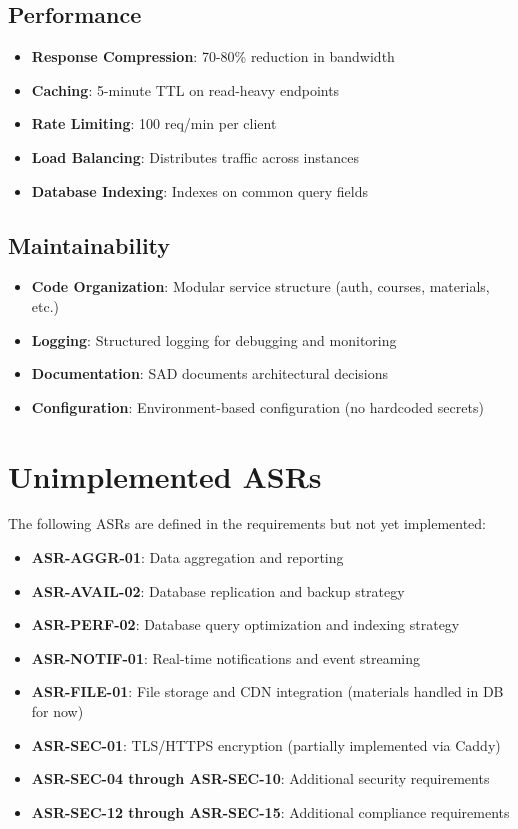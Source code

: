 \documentclass[12pt,oneside,a4paper]{article}
\begin{document}
\subsection{Performance}
\begin{itemize}
    \item \textbf{Response Compression}: 70-80\% reduction in bandwidth
    \item \textbf{Caching}: 5-minute TTL on read-heavy endpoints
    \item \textbf{Rate Limiting}: 100 req/min per client
    \item \textbf{Load Balancing}: Distributes traffic across instances
    \item \textbf{Database Indexing}: Indexes on common query fields
\end{itemize}

\subsection{Maintainability}
\begin{itemize}
    \item \textbf{Code Organization}: Modular service structure (auth, courses, materials, etc.)
    \item \textbf{Logging}: Structured logging for debugging and monitoring
    \item \textbf{Documentation}: SAD documents architectural decisions
    \item \textbf{Configuration}: Environment-based configuration (no hardcoded secrets)
\end{itemize}

\newpage

\section{Unimplemented ASRs}

The following ASRs are defined in the requirements but not yet implemented:

\begin{itemize}
    \item \textbf{ASR-AGGR-01}: Data aggregation and reporting
    \item \textbf{ASR-AVAIL-02}: Database replication and backup strategy
    \item \textbf{ASR-PERF-02}: Database query optimization and indexing strategy
    \item \textbf{ASR-NOTIF-01}: Real-time notifications and event streaming
    \item \textbf{ASR-FILE-01}: File storage and CDN integration (materials handled in DB for now)
    \item \textbf{ASR-SEC-01}: TLS/HTTPS encryption (partially implemented via Caddy)
    \item \textbf{ASR-SEC-04 through ASR-SEC-10}: Additional security requirements
    \item \textbf{ASR-SEC-12 through ASR-SEC-15}: Additional compliance requirements
\end{itemize}
\end{document}
